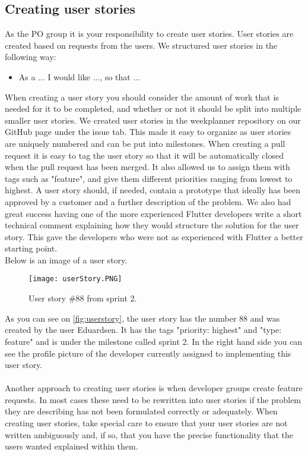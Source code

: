 \subsection{Creating user stories}
As the PO group it is your responsibility to create user stories.
User stories are created based on requests from the users.
We structured user stories in the following way:
\begin{itemize}
    \item As a ... I would like ..., so that ...
\end{itemize}
When creating a user story you should consider the amount of work that is needed for it to be completed, and whether or not it should be split into multiple smaller user stories.
We created user stories in the weekplanner repository on our GitHub page under the issue tab.
This made it easy to organize as user stories are uniquely numbered and can be put into milestones.
When creating a pull request it is easy to tag the user story so that it will be automatically closed when the pull request has been merged.
It also allowed us to assign them with tags such as "feature", and give them different priorities ranging from lowest to highest.
A user story should, if needed, contain a prototype that ideally has been approved by a customer and a further description of the problem.
We also had great success having one of the more experienced Flutter developers write a short technical comment explaining how they would structure the solution for the user story.
This gave the developers who were not as experienced with Flutter a better starting point.
\\
Below is an image of a user story.
\begin{figure}[H]
    \centering
    \texttt{[image: userStory.PNG]}
    \caption{User story \#88 from sprint 2.}
    \label{fig:userstory}
\end{figure}
As you can see on \autoref{fig:userstory}, the user story has the number 88 and was created by the user Eduardsen.
It has the tags "priority: highest" and "type: feature" and is under the milestone called sprint 2.
In the right hand side you can see the profile picture of the developer currently assigned to implementing this user story.
\\\\
Another approach to creating user stories is when developer groups create feature requests.
In most cases these need to be rewritten into user stories if the problem they are describing has not been formulated correctly or adequately.
When creating user stories, take special care to ensure that your user stories are not written ambiguously and, if so, that you have the precise functionality that the users wanted explained within them.

